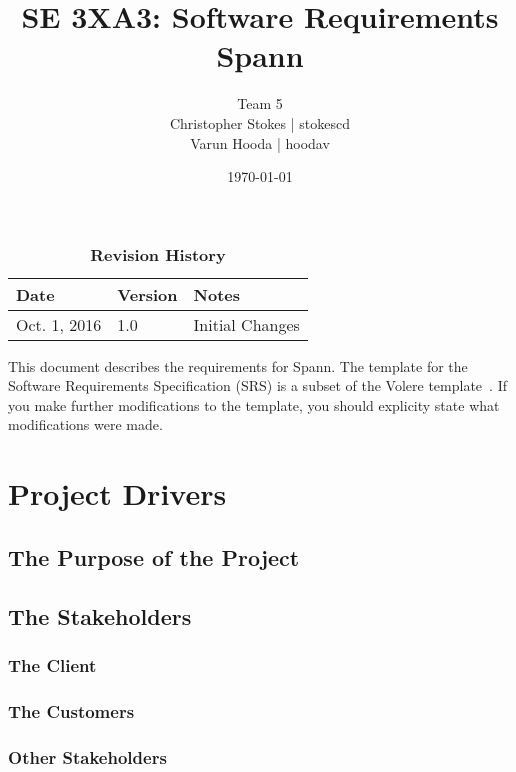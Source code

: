 \documentclass[12pt, titlepage]{article}
\title{SE 3XA3: Software Requirements\\Spann}
\author{Team 5
		\\ Christopher Stokes | stokescd
		\\ Varun Hooda | hoodav
}
\date{\today}
\begin{document}
\maketitle

\tableofcontents
\listoftables
\listoffigures

\begin{table}[bp]
\caption{\bf Revision History}
\begin{tabularx}{\textwidth}{p{3cm}p{2cm}X}
\toprule {\bf Date} & {\bf Version} & {\bf Notes}\\
\midrule
Oct. 1, 2016 & 1.0 & Initial Changes\\
\bottomrule
\end{tabularx}
\end{table}

\newpage


This document describes the requirements for Spann.  The template for the Software
Requirements Specification (SRS) is a subset of the Volere
template~\citep{RobertsonAndRobertson2012}.  If you make further modifications
to the template, you should explicity state what modifications were made.

\section{Project Drivers}

  \subsection{The Purpose of the Project}

  \subsection{The Stakeholders}

    \subsubsection{The Client}

    \subsubsection{The Customers}

    \subsubsection{Other Stakeholders}
\end{document}
